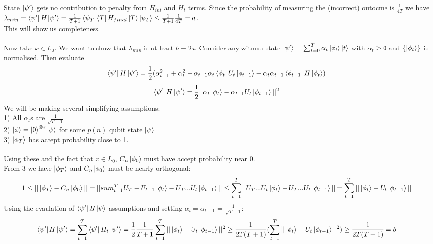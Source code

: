 \documentclass{article}
\begin{document}
                       State $\ket{\psi'}$ gets no contribution to penalty from $H_{int}$ and $H_t$ terms. Since the probability of measuring the (incorrect) outocme is $\frac{1}{4T}$ we have $\lambda_{min} = \bra{\psi'} H \ket{\psi'} = \frac{1}{T+1} \bra{\psi_T} \bra{T} H_{final} \ket{T} \ket{\psi_T} \leq \frac{1}{T+1} \frac{1}{4T} = a$.\\
                       This will show us completeness.\\\\
                       Now take $x \in L_0$. We want to show that $\lambda_{min}$ is at least $b=2a$. Consider any witness state $\ket{\psi'}= \sum_{t=0}^T \alpha_t \ket{\phi_t} \ket{t}$ with $\alpha_t \geq 0$ and $\{ \ket{\phi_t}\}$ is normalised. Then evaluate $$\bra{\psi'} H \ket{\psi'} = \frac{1}{2} ( \alpha^2_{t-1} + \alpha_t^2 - \alpha_{t-1} \alpha_t \bra{\phi_t} U_t \ket{\phi_{t-1}} - \alpha_t \alpha_{t-1} \bra{\phi_{t-1}} H \ket{\phi_t})$$
                       $$
                       \bra{\psi'} H \ket{\psi'} = \frac{1}{2} || \alpha_t \ket{\phi_t} - \alpha_{t-1} U_t \ket{\phi_{t-1}} ||^2
                       $$
                       We will be making several simplifying assumptions:\\
                       1) All $\alpha_t$s are $\frac{1}{\sqrt{T-1}}$\\
                       2) $\ket{\phi} = \ket{0}^{\otimes s} \ket{\psi}$ for some $p(n)$ qubit state $\ket{\psi}$\\
                       3) $\ket{\phi_T}$ has accept probability close to 1.\\\\
                       Using these and the fact that $x \in L_0$, $C_n \ket{\phi_0}$ must have accept probability near 0.\\
                       From 3 we have $\ket{\phi_T}$ and $C_n \ket{\phi_0}$ must be nearly orthogonal:
                       $$
                       1 \leq || \ket{\phi_T} - C_n \ket{\phi_0} || = || sum_{t=1}^T U_T - U_{t-1} \ket{\phi_t} - U_T...U_t\ket{\phi_{t-1}}|| \leq \sum_{t=1}^T || U_T...U_t \ket{\phi_t} - U_T...U_t \ket{\phi_{t-1}}|| = \sum_{t=1}^T || \ket{\phi_t} - U_t \ket{\phi_{t-1}}||
                       $$
                       Using the evaulation of $\bra{\psi'} H \ket{\psi}$ assumptions and setting $\alpha_t = \alpha_{t-1} = \frac{1}{\sqrt{T+1}}$:
                               $$
                               \bra{\psi'} H \ket{\psi'} = \sum_{t=1}^T \bra{\psi'} H_t \ket{\psi'} = \frac{1}{2} \frac{1}{T+1} \sum_{t=1}^T ||\ket{\phi_t} - U_t \ket{\phi_{t-1}} ||^2 \geq \frac{1}{2T(T+1)} ( \sum_{t=1}^T || \ket{\phi_t} - U_t \ket{\phi_{t-1}}||^2 ) \geq \frac{1}{2T(T+1)} = b
                               $$
\end{document}

